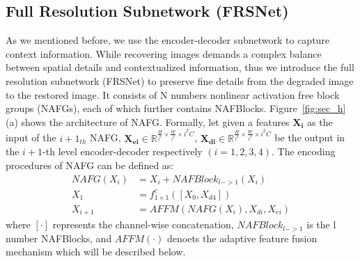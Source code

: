\documentclass[lettersize,journal]{IEEEtran}
\begin{document}
\subsection{Full Resolution Subnetwork (FRSNet)}
As we mentioned before, we use the encoder-decoder subnetwork to capture context information. While recovering images demands a complex balance between spatial details and  contextualized information, thus we introduce the full resolution subnetwork (FRSNet)  to preserve fine details from the degraded image to the restored image.  It consists of N numbers nonlinear activation free block groups (NAFGs), each of which further contains NAFBlocks. Figure~\ref{fig:sec_h}(a) shows the architecture of NAFG.  Formally, let given a features  $\mathbf{X_{i}}$ as the input of the $i+1_{th}$ NAFG, $\mathbf{X_{ei}} \in \mathbb R^{\frac{H}{i^2} \times \frac{W}{i^2} \times {i^2}C}$, $\mathbf{X_{di}} \in \mathbb R^{\frac{H}{i^2} \times \frac{W}{i^2} \times {i^2}C}$ be the output in the $i+1$-th level encoder-decoder respectively $(i=1,2,3,4)$. The encoding procedures of NAFG can be defined as:  
\begin{equation}
\begin{aligned}
	\label{equ:NAFG}
   NAFG(X_{i}) &= X_{i} + NAFBlock_{l->1}(X_{i})
    \\
    X_1 &= f_{1 \times 1}^c([X_0, X_{d4}])
    \\
    X_{i+1} &= AFFM(NAFG(X_{i}),  X_{di} , X_{ei})
\end{aligned}
\end{equation}
where $[\cdot]$ represents the channel-wise concatenation, $NAFBlock_{l->1}$ is the l number NAFBlocks, and $AFFM(\cdot)$ denoets the adaptive feature fusion mechanism which will be described below.
\end{document}
